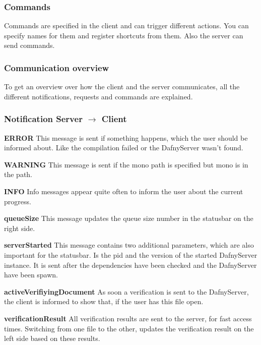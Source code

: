 \subsubsection{Commands}
Commands are specified in the client and can trigger different actions. You can specify names for them and register shortcuts from them. Also the server can send commands. 

\subsubsection{Communication overview}
To get an overview over how the client and the server communicates, all the different notifications, requests and commands are explained. 


\subsubsection{Notification Server $\longrightarrow$ Client}

\textbf{ERROR}
This message is sent if something happens, which the user should be informed about. Like the compilation failed or the DafnyServer wasn't found. \newline

\textbf{WARNING}
This message is sent if the mono path is specified but mono is in the path. \newline

\textbf{INFO}
Info messages appear quite often to inform the user about the current progress. \newline

\textbf{queueSize}
This message updates the queue size number in the statusbar on the right side. \newline

\textbf{serverStarted}
This message contains two additional parameters, which are also important for the statusbar. Is the pid and the version of the started DafnyServer instance. It is sent after the dependencies have been checked and the DafnyServer have been spawn. \newline

\textbf{activeVerifiyingDocument}
As soon a verification is sent to the DafnyServer, the client is informed to show that, if the user has this file open. \newline

\textbf{verificationResult}
All verification results are sent to the server, for fast access times. Switching from one file to the other, updates the verification result on the left side based on these results. \newline


